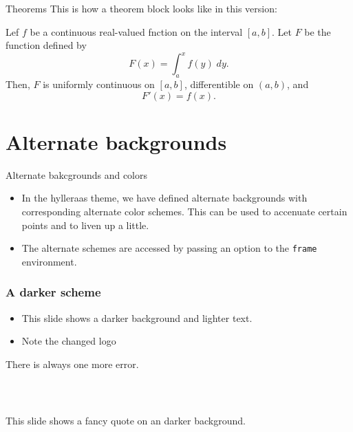 \documentclass[8pt]{beamer} %
\begin{document}
\begin{frame}{Theorems}
This is how a theorem block looks like in this version:
\begin{theorem}
Lef $f$ be a continuous real-valued fnction on the interval $[a,b]$. Let $F$ be the function defined by
\[ F(x) = \int^x_a f(y) \; dy. \]
Then, $F$ is uniformly continuous on $[a,b]$, differentible on $(a,b)$, and
\[ F'(x) = f(x). \]
\end{theorem}
\end{frame}



\section{Alternate backgrounds}

\begin{frame}{Alternate bakcgrounds and colors}
  \begin{itemize}
  \item
    In the hylleraas theme, we have defined alternate backgrounds with corresponding alternate
    color schemes. This can be used to accenuate certain points and to liven up a little.
  \item
    The alternate schemes are accessed by passing an option to the \texttt{frame} environment.
  \end{itemize}
\end{frame}


\begin{frame}[dark]
    \frametitle{A darker scheme}

    \begin{itemize}
      \item  This slide shows a darker background and lighter text.
      \item Note the changed logo
    \end{itemize}

    \begin{theorem}[Errors]
      There is always one more error.
    \end{theorem}

\end{frame}

\begin{frame}[dark]
  \frametitle{~}
  \begin{fancyquote}
    This slide shows a fancy quote on an darker background.
  \end{fancyquote}
\end{frame}
\end{document}
